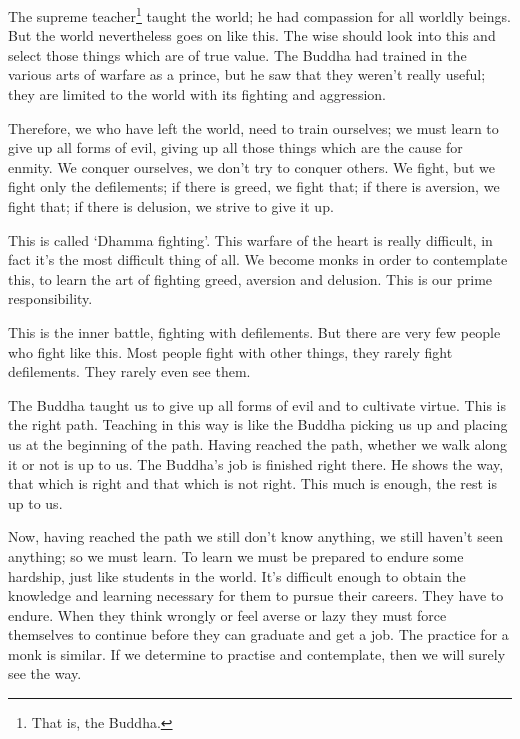 The supreme teacher\footnote{That is, the Buddha.} taught the world; he had compassion for all worldly beings. But the world nevertheless goes on like this. The wise should look into this and select those things which are of true value. The Buddha had trained in the various arts of warfare as a prince, but he saw that they weren't really useful; they are limited to the world with its fighting and aggression.

Therefore, we who have left the world, need to train ourselves; we must learn to give up all forms of evil, giving up all those things which are the cause for enmity. We conquer ourselves, we don't try to conquer others. We fight, but we fight only the defilements; if there is greed, we fight that; if there is aversion, we fight that; if there is delusion, we strive to give it up.

This is called `Dhamma fighting'. This warfare of the heart is really difficult, in fact it's the most difficult thing of all. We become monks in order to contemplate this, to learn the art of fighting greed, aversion and delusion. This is our prime responsibility.

This is the inner battle, fighting with defilements. But there are very few people who fight like this. Most people fight with other things, they rarely fight defilements. They rarely even see them.

The Buddha taught us to give up all forms of evil and to cultivate virtue. This is the right path. Teaching in this way is like the Buddha picking us up and placing us at the beginning of the path. Having reached the path, whether we walk along it or not is up to us. The Buddha's job is finished right there. He shows the way, that which is right and that which is not right. This much is enough, the rest is up to us.

Now, having reached the path we still don't know anything, we still haven't seen anything; so we must learn. To learn we must be prepared to endure some hardship, just like students in the world. It's difficult enough to obtain the knowledge and learning necessary for them to pursue their careers. They have to endure. When they think wrongly or feel averse or lazy they must force themselves to continue before they can graduate and get a job. The practice for a monk is similar. If we determine to practise and contemplate, then we will surely see the way.

